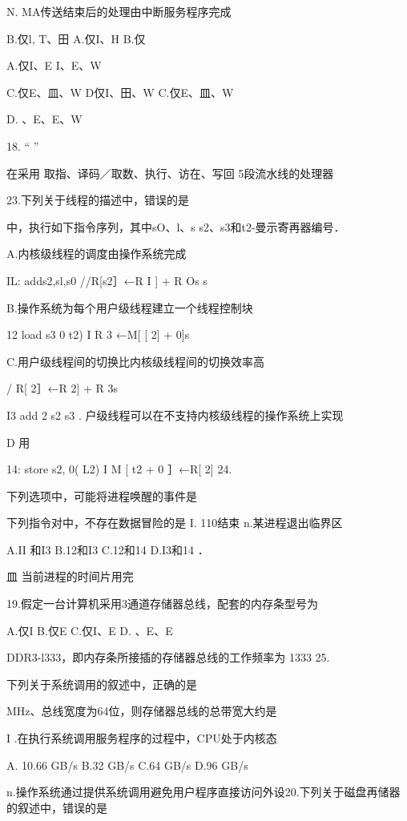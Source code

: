     N. MA传送结束后的处理由中断服务程序完成

    B.仅l, T、田    A.仅I、H    B.仅

   A.仅I、E    I、E、W

   C.仅E、皿、W    D仅I、田、W    C.仅E、皿、W

    D.  、E、E、W

18.    “    ”

   在采用 取指、译码／取数、执行、访在、写回 5段流水线的处理器

    23.下列关于线程的描述中，错误的是

   中，执行如下指令序列，其中sO、l、s  s2、s3和t2-曼示寄再器编号．

    A.内核级线程的调度由操作系统完成

   IL:   adds2,sl,s0     //R[s2］←R  I ] + R  Os     s

    B.操作系统为每个用户级线程建立一个线程控制块

   12    load s3  0  t2)     I  R  3 ←M[ [ 2] + 0]s

    C.用户级线程间的切换比内核级线程间的切换效率高

    /  R[ 2］←R  2] + R  3s

   I3    add 2  s2  s3    .   户级线程可以在不支持内核级线程的操作系统上实现

    D 用

   14:   store s2, 0( L2)     I  M [   t2  + 0 ］←R[ 2]    24.

    下列选项中，可能将进程唤醒的事件是

   下列指令对中，不存在数据冒险的是    I. 110结束    n.某进程退出临界区

   A.II 和I3    B.12和I3    C.12和14    D.I3和14    ．

    皿 当前进程的时间片用完

19.假定一台计算机采用3通道存储器总线，配套的内存条型号为

    A.仅I    B.仅E    C.仅I、E    D. 、E、E

   DDR3-l333，即内存条所接插的存储器总线的工作频率为 1333    25.

    下列关于系统调用的叙述中，正确的是

   MHz、总线宽度为64位，则存储器总线的总带宽大约是

    I .在执行系统调用服务程序的过程中，CPU处于内核态

   A. 10.66 GB/s    B.32 GB/s    C.64 GB/s    D.96 GB/s

    n.操作系统通过提供系统调用避免用户程序直接访问外设20.下列关于磁盘再储器的叙述中，错误的是

